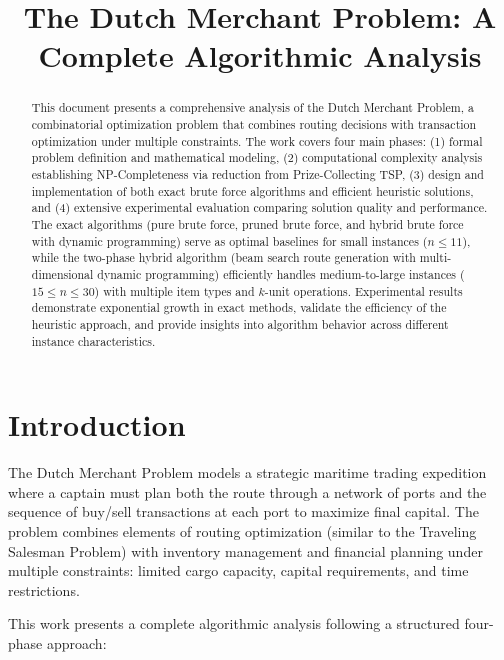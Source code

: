 \documentclass[12pt]{article}
\title{The Dutch Merchant Problem: A Complete Algorithmic Analysis}
\author{}
\date{}
\begin{document}
\maketitle

\begin{abstract}
This document presents a comprehensive analysis of the Dutch Merchant Problem, a combinatorial optimization problem that combines routing decisions with transaction optimization under multiple constraints. The work covers four main phases: (1) formal problem definition and mathematical modeling, (2) computational complexity analysis establishing NP-Completeness via reduction from Prize-Collecting TSP, (3) design and implementation of both exact brute force algorithms and efficient heuristic solutions, and (4) extensive experimental evaluation comparing solution quality and performance. The exact algorithms (pure brute force, pruned brute force, and hybrid brute force with dynamic programming) serve as optimal baselines for small instances ($n \leq 11$), while the two-phase hybrid algorithm (beam search route generation with multi-dimensional dynamic programming) efficiently handles medium-to-large instances ($15 \leq n \leq 30$) with multiple item types and $k$-unit operations. Experimental results demonstrate exponential growth in exact methods, validate the efficiency of the heuristic approach, and provide insights into algorithm behavior across different instance characteristics.
\end{abstract}

\section{Introduction}
\label{sec:introduction}

The Dutch Merchant Problem models a strategic maritime trading expedition where a captain must plan both the route through a network of ports and the sequence of buy/sell transactions at each port to maximize final capital. The problem combines elements of routing optimization (similar to the Traveling Salesman Problem) with inventory management and financial planning under multiple constraints: limited cargo capacity, capital requirements, and time restrictions.

This work presents a complete algorithmic analysis following a structured four-phase approach:
\end{document}
